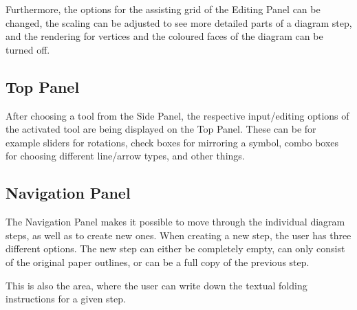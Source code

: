 Furthermore, the options for the assisting grid of the Editing Panel can be changed, the scaling can be adjusted to see more detailed parts of a diagram step, and the rendering for vertices and the coloured faces of the diagram can be turned off.

\subsection{Top Panel}
\label{sec:topPanel}

After choosing a tool from the Side Panel, the respective input/editing options of the activated tool are being displayed on the Top Panel. These can be for example sliders for rotations, check boxes for mirroring a symbol, combo boxes for choosing different line/arrow types, and other things.


\subsection{Navigation Panel}
\label{sec:navigationPanel}

The Navigation Panel makes it possible to move through the individual diagram steps, as well as to create new ones. When creating a new step, the user has three different options. The new step can either be completely empty, can only consist of the original paper outlines, or can be a full copy of the previous step.

This is also the area, where the user can write down the textual folding instructions for a given step.
